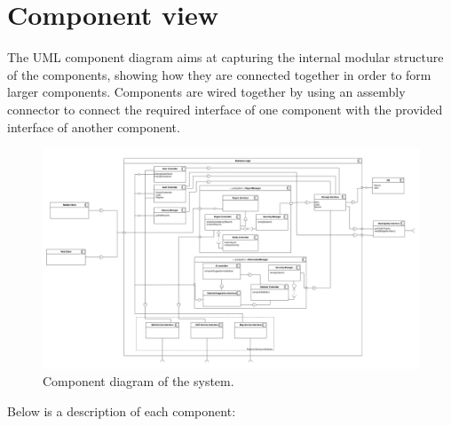 \documentclass{report}
\begin{document}
\section{Component view}
The UML component diagram aims at capturing the internal modular structure of the components, showing how they are connected together in order to form larger components. Components are wired together by using an assembly connector to connect the required interface of one component with the provided interface of another component.
\begin{figure}[!ht]
	\begin{center}
	\includegraphics[width=\textwidth]{img/Component2_2.png}
    \end{center}
    \label{fig:componentdiagram}
	\caption{Component diagram of the system.}
\end{figure}
Below is a description of each component:
\end{document}
